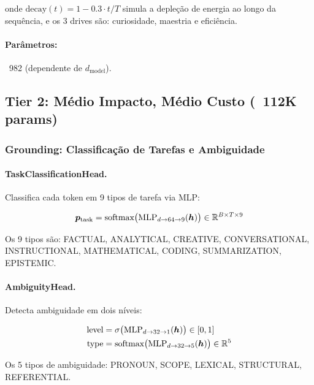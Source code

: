 onde $\text{decay}(t) = 1 - 0.3 \cdot t / T$ simula a deple\c{c}\~ao de
energia ao longo da sequ\^encia, e os 3 drives s\~ao: curiosidade,
maestria e efici\^encia.

\paragraph{Par\^ametros:} ~982 (dependente de $d_{\text{model}}$).

\subsection{Tier 2: M\'edio Impacto, M\'edio Custo (~112K params)}

\subsubsection{Grounding: Classifica\c{c}\~ao de Tarefas e Ambiguidade}
\label{sec:grounding}

\paragraph{TaskClassificationHead.}
Classifica cada token em 9 tipos de tarefa via MLP:

\begin{equation}
    \bm{p}_{\text{task}} = \text{softmax}\big(\text{MLP}_{d \to 64 \to 9}(\bm{h})\big) \in \mathbb{R}^{B \times T \times 9}
\end{equation}

Os 9 tipos s\~ao: FACTUAL, ANALYTICAL, CREATIVE, CONVERSATIONAL,
INSTRUCTIONAL, MATHEMATICAL, CODING, SUMMARIZATION, EPISTEMIC.

\paragraph{AmbiguityHead.}
Detecta ambiguidade em dois n\'iveis:

\begin{align}
    \text{level} &= \sigma\big(\text{MLP}_{d \to 32 \to 1}(\bm{h})\big) \in [0, 1] \\
    \text{type} &= \text{softmax}\big(\text{MLP}_{d \to 32 \to 5}(\bm{h})\big) \in \mathbb{R}^5
\end{align}

Os 5 tipos de ambiguidade: PRONOUN, SCOPE, LEXICAL, STRUCTURAL, REFERENTIAL.

